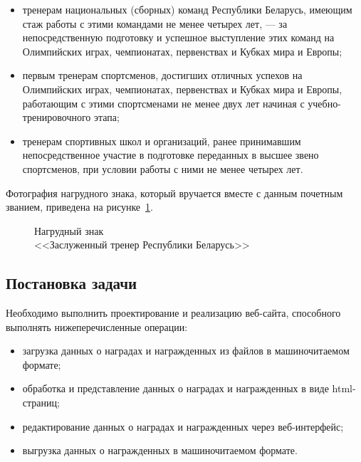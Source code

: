 \begin{itemize}
\item
  тренерам национальных (сборных) команд Республики Беларусь,
  имеющим стаж работы с этими командами не менее четырех лет,
  --- за непосредственную подготовку и успешное выступление этих команд
  на Олимпийских играх, чемпионатах, первенствах и Кубках мира и Европы;
\item
  первым тренерам спортсменов, достигших отличных успехов
  на Олимпийских играх, чемпионатах, первенствах и Кубках мира и Европы,
  работающим с этими спортсменами не менее двух лет начиная
  с учебно-тренировочного этапа;
\item
  тренерам спортивных школ и организаций, ранее принимавшим
  непосредственное участие в подготовке переданных в высшее
  звено спортсменов, при условии работы с ними не менее четырех лет.
\end{itemize}

Фотография нагрудного знака, 
который вручается вместе с данным почетным званием, 
приведена на рисунке~\ref{fig:trener_belarus}.

\begin{figure}[h]
  \centering
  {
    \setlength{\fboxsep}{0pt}%
    \setlength{\fboxrule}{1pt}%
  }
  \caption{Нагрудный знак \\ <<Заслуженный тренер Республики Беларусь>>}
  \label{fig:trener_belarus}
\end{figure}


\subsection{Постановка задачи}

Необходимо выполнить проектирование и реализацию веб-сайта, 
способного выполнять нижеперечисленные операции:

\begin{itemize}
\item загрузка данных о наградах и награжденных из файлов
  в машиночитаемом формате;
\item обработка и представление данных о наградах и награжденных
  в виде html-страниц;
\item редактирование данных о наградах и награжденных 
  через веб-интерфейс;
\item выгрузка данных о награжденных в машиночитаемом 
  формате.
\end{itemize}

